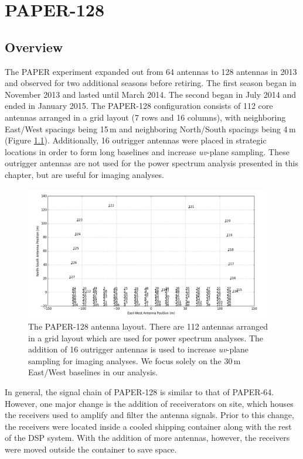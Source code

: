 \chapter{PAPER-128}
\label{c.PSA128}

\section{Overview}

The PAPER experiment expanded out from 64 antennas to 128 antennas in 2013 and observed for two additional seasons before retiring. The first season began in November 2013 and lasted until March 2014. The second began in July 2014 and ended in January 2015. The PAPER-128 configuration consists of 112 core antennas arranged in a grid layout (7 rows and 16 columns), with neighboring East/West spacings being 15\,m and neighboring North/South spacings being 4\,m (Figure \ref{fig:paper128_array}). Additionally, 16 outrigger antennas were placed in strategic locations in order to form long baselines and increase \textit{uv}-plane sampling. These outrigger antennas are not used for the power spectrum analysis presented in this chapter, but are useful for imaging analyses.

\begin{figure}
	\centering
	\includegraphics[width=0.96\textwidth]{plots/paper128_layout.png}
	\caption{The PAPER-128 antenna layout. There are 112 antennas arranged in a grid layout which are used for power spectrum analyses. The addition of 16 outrigger antennas is used to increase \textit{uv}-plane sampling for imaging analyses. We focus solely on the 30\,m East/West baselines in our analysis.}
	\label{fig:paper128_array}
\end{figure}

In general, the signal chain of PAPER-128 is similar to that of PAPER-64. However, one major change is the addition of receiverators on site, which houses the receivers used to amplify and filter the antenna signals. Prior to this change, the receivers were located inside a cooled shipping container along with the rest of the DSP system. With the addition of more antennas, however, the receivers were moved outside the container to save space. 

